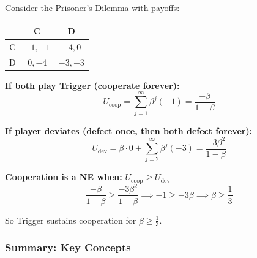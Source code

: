 \begin{exbox}
Consider the Prisoner's Dilemma with payoffs:
\begin{center}
\renewcommand{\arraystretch}{1.2}
\begin{tabular}{@{} c | c c @{}}
 & C & D \\
\midrule
C & $-1, -1$ & $-4, 0$ \\
D & $0, -4$ & $-3, -3$ \\
\end{tabular}
\end{center}

\textbf{If both play Trigger (cooperate forever):}
\[
U_{\text{coop}} = \sum_{j=1}^{\infty} \beta^j (-1) = \frac{-\beta}{1 - \beta}
\]

\textbf{If player deviates (defect once, then both defect forever):}
\[
U_{\text{dev}} = \beta \cdot 0 + \sum_{j=2}^{\infty} \beta^j (-3) = \frac{-3\beta^2}{1 - \beta}
\]

\textbf{Cooperation is a NE when:} $U_{\text{coop}} \geq U_{\text{dev}}$
\[
\frac{-\beta}{1 - \beta} \geq \frac{-3\beta^2}{1 - \beta} \implies -1 \geq -3\beta \implies \beta \geq \frac{1}{3}
\]

So Trigger sustains cooperation for $\beta \geq \frac{1}{3}$.
\end{exbox}

\bigseparator

\subsubsection{Summary: Key Concepts}

